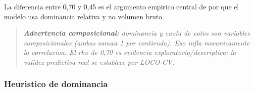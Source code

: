 \documentclass[11pt,a4paper]{article}
\begin{document}
La diferencia entre 0,70 y 0,45 es el argumento empirico central de por que el modelo usa dominancia relativa y no volumen bruto.\\[2pt]

\begin{quote}\itshape \textbf{Advertencia composicional:} dominancia y cuota de votos son variables composicionales (ambas suman 1 por contienda). Eso infla mecanicamente la correlacion. El rho de 0,70 es evidencia exploratoria/descriptiva; la validez predictiva real se establece por LOCO-CV.\end{quote}

\subsubsection{Heuristico de dominancia}
\end{document}

